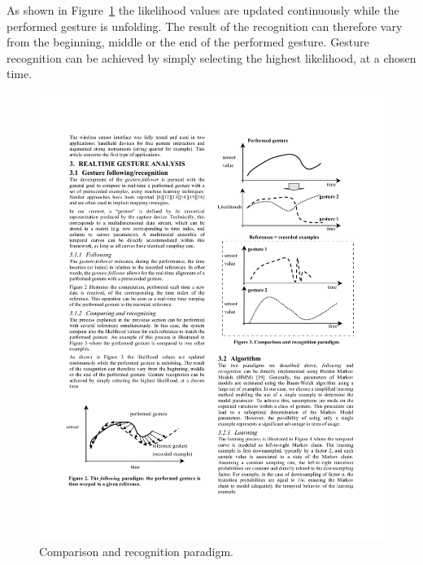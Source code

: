 As shown in Figure~\ref{Bevilacqua:fig3} the likelihood values are updated continuously while the performed gesture is unfolding. The result of the recognition can therefore vary from the beginning, middle or the end of the performed gesture. Gesture recognition can be achieved by simply selecting the highest likelihood, at a chosen time.

\begin{figure}[t]
\center
\includegraphics[scale=1.]{fig3.pdf}
%
%
\caption{Comparison and recognition paradigm.}
\label{Bevilacqua:fig3}       %
\end{figure}

